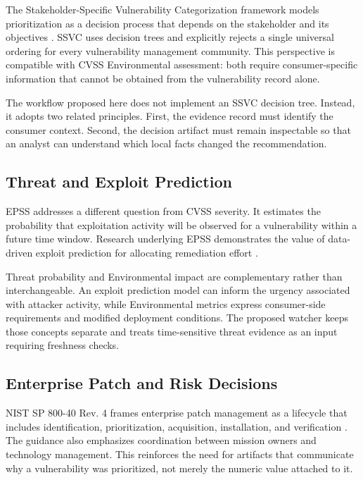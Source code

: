 \documentclass[conference]{IEEEtran}
\begin{document}
The Stakeholder-Specific Vulnerability Categorization framework models
prioritization as a decision process that depends on the stakeholder and its
objectives \cite{spring2021ssvc}. SSVC uses decision trees and explicitly
rejects a single universal ordering for every vulnerability management
community. This perspective is compatible with CVSS Environmental assessment:
both require consumer-specific information that cannot be obtained from the
vulnerability record alone.

The workflow proposed here does not implement an SSVC decision tree. Instead,
it adopts two related principles. First, the evidence record must identify the
consumer context. Second, the decision artifact must remain inspectable so that
an analyst can understand which local facts changed the recommendation.

\subsection{Threat and Exploit Prediction}

EPSS addresses a different question from CVSS severity. It estimates the
probability that exploitation activity will be observed for a vulnerability
within a future time window. Research underlying EPSS demonstrates the value
of data-driven exploit prediction for allocating remediation effort
\cite{jacobs2020remediation,jacobs2021epss,jacobs2023epss}.

Threat probability and Environmental impact are complementary rather than
interchangeable. An exploit prediction model can inform the urgency associated
with attacker activity, while Environmental metrics express consumer-side
requirements and modified deployment conditions. The proposed watcher keeps
those concepts separate and treats time-sensitive threat evidence as an input
requiring freshness checks.

\subsection{Enterprise Patch and Risk Decisions}

NIST SP 800-40 Rev. 4 frames enterprise patch management as a lifecycle that
includes identification, prioritization, acquisition, installation, and
verification \cite{nist80040r4}. The guidance also emphasizes coordination
between mission owners and technology management. This reinforces the need for
artifacts that communicate why a vulnerability was prioritized, not merely the
numeric value attached to it.
\end{document}
